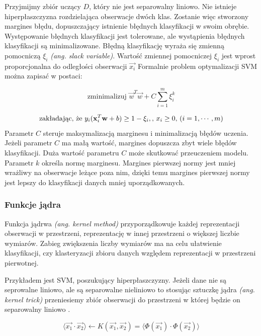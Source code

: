 \documentclass[a4paper,12pt,twoside,openany]{report}
\newcommand{\ang}[1]{\textit{(ang. #1)}}
\begin{document}
Przyjmijmy zbiór uczący $D$, który nie jest separowalny liniowo. 
Nie istnieje hiperpłaszczyzna rozdzielająca obserwacje dwóch klas.
Zostanie więc stworzony margines błędu, dopuszczający istnienie błędnych klasyfikacji w swoim obrębie.
Występowanie błędnych klasyfikacji jest tolerowane, ale wystąpienia błędnych klasyfikacji są minimalizowane.
Błędną klasyfikację wyraża się zmienną pomocniczą $\xi_i$ \ang{slack variable}. 
Wartość zmiennej pomocniczej $\xi_i$ jest wprost proporcjonalna do odległości obserwacji $\vec{x_i}$
Formalnie problem optymalizacji SVM można zapisać w postaci:

\begin{equation}
\mbox{zminimalizuj } {\vec w}^T {\vec w}+C\sum_{i=1}^m \xi_i^k
\end{equation}

\begin{equation}
	\mbox{zakładając, że }  y_i ({\bf x}_i^T {\bf w}+b) \ge 1-\xi_i,
	\mbox{, }x_i \ge 0 \mbox{, }(i=1,\cdots,m)
\end{equation}
Parametr $C$ steruje maksymalizacją marginesu i minimalizacją błędów uczenia.
Jeżeli parametr $C$ ma małą wartość, margines dopuszcza zbyt wiele błędów klasyfikacji.
Duża wartość parametru $C$ może skutkować przeuczeniem modelu.
Parametr $k$ określa normę marginesu. 
Margines pierwszej normy jest mniej wrażliwy na obserwacje leżące poza nim,
dzięki temu margines pierwszej normy jest lepszy do klasyfikacji danych mniej uporządkowanych.

\subsubsection{Funkcje jądra}
Funkcja jądrwa \ang{kernel method} 
przyporządkowuje każdej reprezentacji obserwacji w przestrzeni,
reprezentację w innej przestrzeni o większej liczbie wymiarów.
Zabieg zwiększenia liczby wymiarów ma na celu ułatwienie 
klasyfikacji, czy klasteryzacji zbioru danych względem
reprezentacji w przestrzeni pierwotnej. 

Przykładem jest SVM, poszukujący hiperpłaszczyzny.
Jeżeli dane nie są seprowalne liniowo,
ale są separowalne nieliniowo to stosując sztuczkę jądra \ang{kernel trick} 
przeniesiemy zbiór obserwacji do przestrzeni w której będzie on separowalny liniowo \cite{Patle2013}.

\begin{equation}
	\langle \vec{x_1} \cdot \vec{x_2} \rangle \gets K(\vec{x_1}, \vec{x_2}) = \langle \Phi(\vec{x_1}) \cdot \Phi(\vec{x_2}) \rangle
\end{equation}
\end{document}
